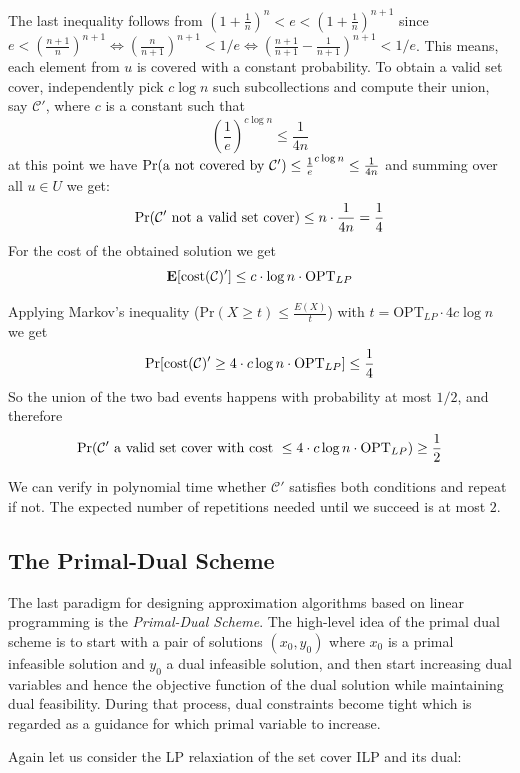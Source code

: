 \documentclass{article}
\begin{document}
The last inequality follows from $(1+\frac{1}{n})^n < e < (1+\frac{1}{n})^{n+1}$ since
$e<(\frac{n+1}{n})^{n+1} \Leftrightarrow (\frac{n}{n+1})^{n+1} < 1/e \Leftrightarrow (\frac{n+1}{n+1}-\frac{1}{n+1})^{n+1}<1/e$.
This means, each element from $u$ is covered with a constant probability.
To obtain a valid set cover, independently pick $c \log n$ such subcollections and compute their union, say $\mathcal{C}'$, where $c$
is a constant such that
\[
	(\frac{1}{e})^{c\log n }\leq \frac{1}{4n}
\]
at this point we have ${\bf \mathrm{Pr}}(\mathrm{a~not~covered~by~}\mathcal{C}') \leq \frac{1}{e}^{c\log n} \leq \frac{1}{4n}$
and summing over all $u\in U$ we get:
\[
	{\bf \mathrm{Pr}}(\mathcal{C}'\mathrm{~not~a~valid~set~cover}) \leq n\cdot \frac{1}{4n}=\frac{1}{4}
\]
For the cost of the obtained solution we get 
\[
	{\bf E}[\mathrm{cost}(\mathcal{C})']\leq c\cdot \log n\cdot \mathrm{OPT}_{LP}
\]

Applying Markov's inequality ($\mathrm{Pr}(X\geq t)\leq \frac{E(X)}{t}$)
with $t=\mathrm{OPT}_{LP}\cdot 4c \log n$ we get
\[
	{\bf \mathrm{Pr}}[\mathrm{cost}(\mathcal{C})'\geq 4\cdot c \log n \cdot \mathrm{OPT}_{LP}]\leq \frac{1}{4} 
\]
So the union of the two bad events happens with probability at most $1/2$, and therefore 
\[
	{\bf \mathrm{Pr}}(\mathcal{C}'\mathrm{~a~valid~set~cover~with~cost~}\leq 4\cdot c \log n \cdot \mathrm{OPT}_{LP}) 
		\geq \frac{1}{2}
\]

We can verify in polynomial time whether $\mathcal{C}'$ satisfies both conditions and repeat if not. The expected number of
repetitions needed until we succeed is at most $2$.


\subsection{The Primal-Dual Scheme}
The last paradigm for designing approximation algorithms based on linear programming is the \emph{Primal-Dual Scheme}. The high-level idea of the primal dual scheme is to start with a pair of solutions $(x_0, y_0)$ where $x_0$ is a primal infeasible solution and $y_0$ a dual infeasible solution, and then start increasing dual variables and hence the objective function of the dual solution while maintaining dual feasibility. During that process, dual constraints become tight which is regarded as a guidance for which primal variable to increase.

Again let us consider the LP relaxiation of the set cover ILP and its dual:
\end{document}
